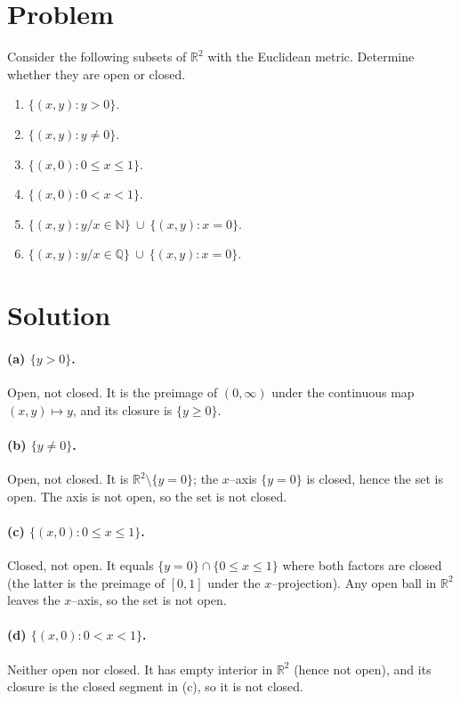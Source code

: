 \documentclass[12pt,a4paper]{article}
\begin{document}
\section*{Problem}
Consider the following subsets of $\mathbb{R}^2$ with the Euclidean metric. Determine whether they are open or closed.
\begin{enumerate}[label=(\alph*)]
	\item $\{(x,y): y>0\}$.
	\item $\{(x,y): y\ne 0\}$.
	\item $\{(x,0): 0\le x\le 1\}$.
	\item $\{(x,0): 0< x< 1\}$.
	\item $\{(x,y): y/x\in\mathbb{N}\}\ \cup\ \{(x,y): x=0\}$.
	\item $\{(x,y): y/x\in\mathbb{Q}\}\ \cup\ \{(x,y): x=0\}$.
\end{enumerate}

\section*{Solution}
\paragraph{(a) $\{y>0\}$.}
Open, not closed. It is the preimage of $(0,\infty)$ under the continuous map $(x,y)\mapsto y$, and its closure is $\{y\ge0\}$.

\paragraph{(b) $\{y\ne0\}$.}
Open, not closed. It is $\mathbb{R}^2\setminus\{y=0\}$; the $x$--axis $\{y=0\}$ is closed, hence the set is open. The axis is not open, so the set is not closed.

\paragraph{(c) $\{(x,0): 0\le x\le1\}$.}
Closed, not open. It equals $\{y=0\}\cap\{0\le x\le1\}$ where both factors are closed (the latter is the preimage of $[0,1]$ under the $x$--projection). Any open ball in $\mathbb{R}^2$ leaves the $x$--axis, so the set is not open.

\paragraph{(d) $\{(x,0): 0<x<1\}$.}
Neither open nor closed. It has empty interior in $\mathbb{R}^2$ (hence not open), and its closure is the closed segment in (c), so it is not closed.
\end{document}
